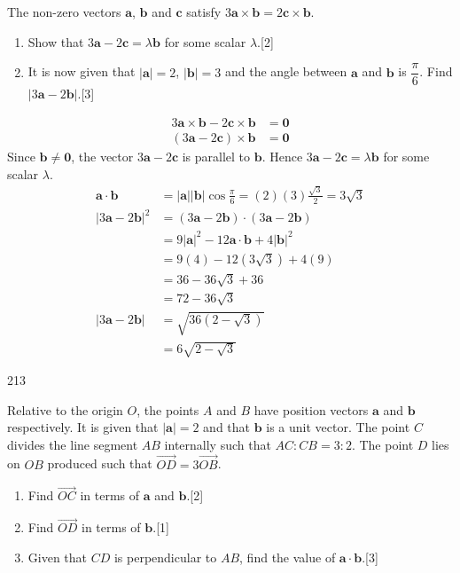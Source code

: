 \documentclass[a4paper,11pt,oneside]{book}
\makeatletter
\newcounter{wq}[section]
\renewcommand{\thesection}{\arabic{section}}
\newcommand{\Q}[1]{\par\needspace{5\baselineskip}\medskip\stepcounter{wq}\noindent\textbf{\thewq}\quad #1\par}
\newcommand{\wsol}[1]{\vspace{-2ex}\xdef\ri@qid{ws\thesection q\thewq}\expandafter\gdef\csname ri@hp@\ri@qid\endcsname{}\ri@keep{\ri@qid}\begin{risol}#1\par\end{risol}}
\newcommand{\wrow}[1]{\ri@row{#1}}
\makeatother
\begin{document}
\Q{The non-zero vectors $\mathbf a$, $\mathbf b$ and $\mathbf c$ satisfy $3\mathbf a\times\mathbf b=2\mathbf c\times\mathbf b$.\begin{enumerate}[label=\textbf{(\alph*)},leftmargin=2.2em,itemsep=3pt]\item Show that $3\mathbf a-2\mathbf c=\lambda\mathbf b$ for some scalar $\lambda$.\hfill[2]\item It is now given that $|\mathbf a|=2$, $|\mathbf b|=3$ and the angle between $\mathbf a$ and $\mathbf b$ is $\dfrac{\pi}{6}$. Find $|3\mathbf a-2\mathbf b|$.\hfill[3]\end{enumerate}}
\wsol{\wrow{(a)}\begin{align*}3\mathbf a\times\mathbf b-2\mathbf c\times\mathbf b&=\mathbf 0\\ (3\mathbf a-2\mathbf c)\times\mathbf b&=\mathbf 0\end{align*}Since $\mathbf b\neq\mathbf 0$, the vector $3\mathbf a-2\mathbf c$ is parallel to $\mathbf b$. Hence $3\mathbf a-2\mathbf c=\lambda\mathbf b$ for some scalar $\lambda$.
\wrow{(b)}\begin{align*}\mathbf a\cdot\mathbf b&=|\mathbf a||\mathbf b|\cos\tfrac{\pi}{6}=(2)(3)\tfrac{\sqrt3}{2}=3\sqrt3\\ |3\mathbf a-2\mathbf b|^2&=(3\mathbf a-2\mathbf b)\cdot(3\mathbf a-2\mathbf b)\\ &=9|\mathbf a|^2-12\mathbf a\cdot\mathbf b+4|\mathbf b|^2\\ &=9(4)-12(3\sqrt3)+4(9)\\ &=36-36\sqrt3+36\\ &=72-36\sqrt3\\ |3\mathbf a-2\mathbf b|&=\sqrt{36(2-\sqrt3)}\\ &=6\sqrt{2-\sqrt3}\end{align*}}
\clearpage
\expandafter\gdef\csname ri@mk@ws9q5(a)\endcsname{2}\expandafter\gdef\csname ri@mk@ws9q5(b)\endcsname{1}\expandafter\gdef\csname ri@mk@ws9q5(c)\endcsname{3}
\Q{Relative to the origin $O$, the points $A$ and $B$ have position vectors $\mathbf a$ and $\mathbf b$ respectively. It is given that $|\mathbf a|=2$ and that $\mathbf b$ is a unit vector. The point $C$ divides the line segment $AB$ internally such that $AC:CB=3:2$. The point $D$ lies on $OB$ produced such that $\overrightarrow{OD}=3\overrightarrow{OB}$.\begin{enumerate}[label=\textbf{(\alph*)},leftmargin=2.2em,itemsep=3pt]\item Find $\overrightarrow{OC}$ in terms of $\mathbf a$ and $\mathbf b$.\hfill[2]\item Find $\overrightarrow{OD}$ in terms of $\mathbf b$.\hfill[1]\item Given that $CD$ is perpendicular to $AB$, find the value of $\mathbf a\cdot\mathbf b$.\hfill[3]\end{enumerate}}
\end{document}
